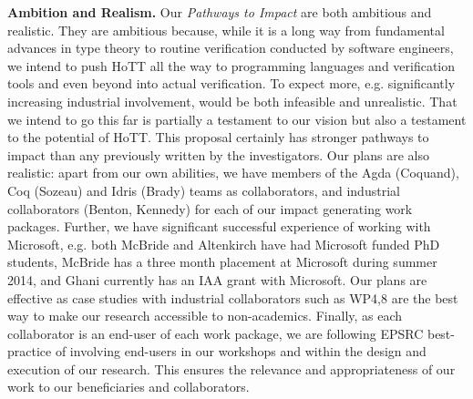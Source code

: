 \documentclass[a4paper,11pt]{article}
\begin{document}
{\bf Ambition and Realism.} Our {\em Pathways to Impact} are both
ambitious and realistic. They are ambitious because, while it is a
long way from fundamental advances in type theory to routine
verification conducted by software engineers, we intend to push
HoTT all the way to programming languages and verification tools and
even beyond into actual verification. To expect more,
e.g. significantly increasing industrial involvement, would be both
infeasible and unrealistic. That we intend to go this far is partially a
testament to our vision but also a testament to the potential of
HoTT. This proposal certainly has stronger pathways to impact than any
previously written by the investigators. Our plans are also realistic:
apart from our own abilities, we have members of the Agda (Coquand),
Coq (Sozeau) and Idris (Brady) teams as collaborators, and industrial
collaborators (Benton, Kennedy) for each of our impact generating work
packages. Further, we have significant successful experience of
working with Microsoft, e.g. both McBride and Altenkirch have had
Microsoft funded PhD students, McBride has a three month placement
at Microsoft during summer 2014, and Ghani currently has an IAA
grant with Microsoft. Our plans are effective as case studies with industrial
collaborators such as WP4,8 are the best way to make our research
accessible to non-academics. Finally, as each collaborator is
an end-user of each work package, we are following EPSRC best-practice
of involving end-users in our workshops and within the 
design and execution of our research. This ensures the relevance and
appropriateness of our work to our beneficiaries and
collaborators.






\end{document}
